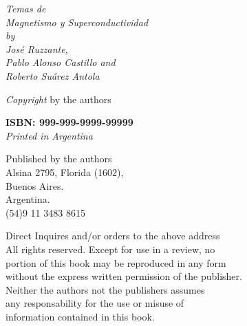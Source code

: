 \documentclass[
11pt, %
spanish,
singlespacing, %
parskip, %
headsepline, %
]{MastersDoctoralThesis} %
\begin{document}






\newpage
\begin{flushleft}
\begin{small}

\vspace{10.0cm} 

\vfill

\textit{Temas de \\ Magnetismo y Superconductividad \\
by \\
José Ruzzante, \\ %
Pablo Alonso Castillo and \\ %
Roberto Suárez Antola}
\vspace{5mm} 

\textit{Copyright}  by the authors
\vspace{5mm} 

\textbf{ISBN: 999-999-9999-99999} \\
\textit{Printed in Argentina}
\vspace{5mm} 

Published by the authors\\ 
Alsina 2795, Florida (1602),\\
Buenos Aires.\\
Argentina.\\
(54)9 11 3483 8615
\vspace{5mm} 

Direct Inquires and/or orders to the above address\\
\vspace{5mm} 
All rights reserved. Except for use in a review, no\\
portion of this book may be reproduced in any form\\
without the express written permission of the publisher.\\
\vspace{5mm} 
Neither the authors not the publishers assumes\\
any responsability for the use or misuse of\\
information contained in this book.\\


\end{small}
\end{flushleft} 
\end{document}
